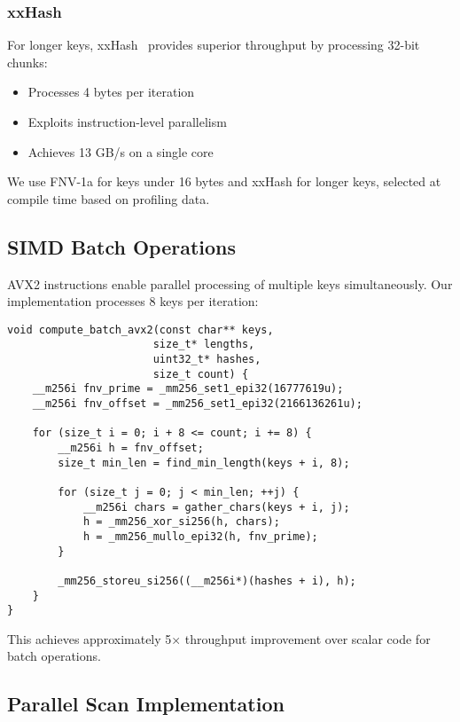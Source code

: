 \documentclass[11pt]{article}
\begin{document}
\subsubsection{xxHash}
For longer keys, xxHash~\cite{xxhash} provides superior throughput by processing 32-bit chunks:
\begin{itemize}
\item Processes 4 bytes per iteration
\item Exploits instruction-level parallelism
\item Achieves 13 GB/s on a single core
\end{itemize}

We use FNV-1a for keys under 16 bytes and xxHash for longer keys, selected at compile time based on profiling data.

\subsection{SIMD Batch Operations}

AVX2 instructions enable parallel processing of multiple keys simultaneously. Our implementation processes 8 keys per iteration:

\begin{lstlisting}[caption={SIMD batch hash computation},label={lst:simd}]
void compute_batch_avx2(const char** keys, 
                       size_t* lengths,
                       uint32_t* hashes,
                       size_t count) {
    __m256i fnv_prime = _mm256_set1_epi32(16777619u);
    __m256i fnv_offset = _mm256_set1_epi32(2166136261u);
    
    for (size_t i = 0; i + 8 <= count; i += 8) {
        __m256i h = fnv_offset;
        size_t min_len = find_min_length(keys + i, 8);
        
        for (size_t j = 0; j < min_len; ++j) {
            __m256i chars = gather_chars(keys + i, j);
            h = _mm256_xor_si256(h, chars);
            h = _mm256_mullo_epi32(h, fnv_prime);
        }
        
        _mm256_storeu_si256((__m256i*)(hashes + i), h);
    }
}
\end{lstlisting}

This achieves approximately 5× throughput improvement over scalar code for batch operations.

\subsection{Parallel Scan Implementation}
\end{document}
